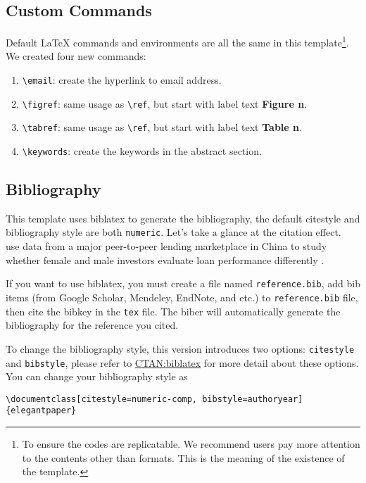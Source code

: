\documentclass[11pt,en]{elegantpaper}
\begin{document}
\subsection{Custom Commands}
Default \LaTeX{} commands and environments are all the same in this template\footnote{To ensure the codes are replicatable. We recommend users pay more attention to the contents other than formats. This is the meaning of the existence of the template.}. We created four new commands:
\begin{enumerate}
  \item \lstinline{\email}: create the hyperlink to email address.
  \item \lstinline{\figref}: same usage as \lstinline{\ref}, but start with label text \textbf{Figure n}.
  \item \lstinline{\tabref}: same usage as \lstinline{\ref}, but start with label text \textbf{Table n}.
  \item \lstinline{\keywords}: create the keywords in the abstract section.
\end{enumerate}


\subsection{Bibliography}

This template uses biblatex to generate the bibliography, the default citestyle and bibliography style are both \lstinline{numeric}. Let's take a glance at the citation effect. ~\cite{en1} use data from a major peer-to-peer lending \cite{en3} marketplace in China to study whether female and male investors evaluate loan performance differently \parencite{en2}. 

If you want to use biblatex, you must create a file named \lstinline{reference.bib}, add bib items (from Google Scholar, Mendeley, EndNote, and etc.) to \lstinline{reference.bib} file, then cite the bibkey in the \lstinline{tex} file. The biber will automatically generate the bibliography for the reference you cited.


To change the bibliography style, this version introduces two options: \lstinline{citestyle} and \lstinline{bibstyle}, please refer to \href{https://ctan.org/pkg/biblatex}{CTAN:biblatex} for more detail about these options. You can change your bibliography style as

\begin{lstlisting}
\documentclass[citestyle=numeric-comp, bibstyle=authoryear]{elegantpaper} 
\end{lstlisting}
\end{document}
